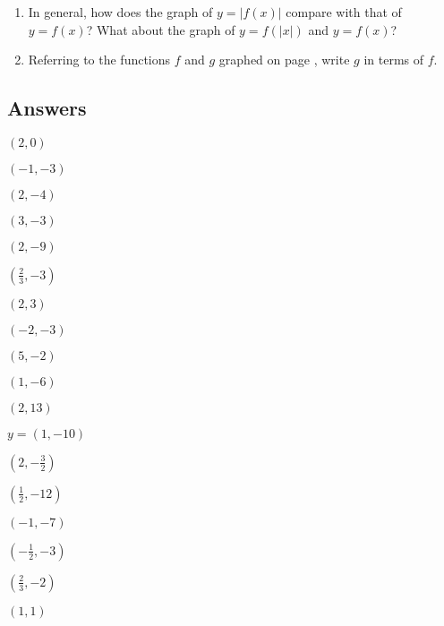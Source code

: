 \begin{enumerate}
\begin{enumerate}
\item  In general, how does the graph of $y = |f(x)|$ compare with that of $y = f(x)$?  What about the graph of $y = f(|x|)$ and $y = f(x)$?

\item  Referring to the functions $f$ and $g$ graphed on page \pageref{relatedbyabsgraphs}, write $g$ in terms of $f$.

\end{enumerate}

\setcounter{HW}{\value{enumi}}
\end{enumerate}

\newpage

\subsection{Answers}

\startexenum

\begin{shortexenum}
\item $(2,0)$
\item $(-1,-3)$
\item $(2,-4)$
\item $(3,-3)$
\item $(2,-9)$
\item $\left(\frac{2}{3}, -3\right)$
\item $(2,3)$
\item $(-2,-3)$
\item $(5,-2)$
\item $(1,-6)$
\item $(2,13)$
\item $y = (1,-10)$
\item $\left(2, -\frac{3}{2}\right)$
\item $\left(\frac{1}{2}, -12 \right)$
\item $(-1,-7)$
\item $\left(-\frac{1}{2}, -3\right)$
\item $\left(\frac{2}{3}, -2 \right)$
\item $(1,1)$
\end{shortexenum}

